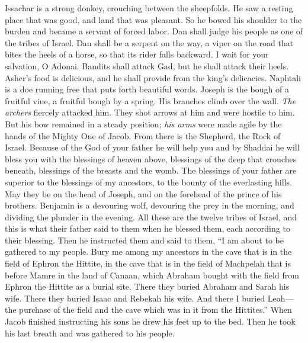 \begin{biblechapter}
\verse Issachar is a strong donkey, 
crouching between the sheepfolds.
\verse He saw a resting place that was good, 
and land that was pleasant. 
So he bowed his shoulder to the burden 
and became a servant of forced labor.
\verse Dan shall judge his people 
as one of the tribes of Israel.
\verse Dan shall be a serpent on the way, 
a viper on the road 
that bites the heels of a horse, 
so that its rider falls backward.
\verse I wait for your salvation, O Adonai.
\verse Bandits shall attack Gad, 
but he shall attack their heels.
\verse Asher’s food is delicious, 
and he shall provide from the king’s delicacies.
\verse Naphtali is a doe running free 
that puts forth beautiful words.
\verse Joseph is the bough of a fruitful vine, 
a fruitful bough by a spring. 
His branches climb over the wall.
\verse \textit{The archers} fiercely attacked him. 
They shot arrows at him and were hostile to him.
\verse But his bow remained in a steady position; 
\textit{his arms} were made agile 
by the hands of the Mighty One of Jacob. 
From there is the Shepherd, the Rock of Israel.
\verse Because of the God of your father he will help you 
and by Shaddai he will bless you 
with the blessings of heaven above, 
blessings of the deep that crouches beneath, 
blessings of the breasts and the womb.
\verse The blessings of your father 
are superior to the blessings of my ancestors, 
to the bounty of the everlasting hills. 
May they be on the head of Joseph, 
and on the forehead of the prince of his brothers.
\verse Benjamin is a devouring wolf, 
devouring the prey in the morning, 
and dividing the plunder in the evening.
 All these are the twelve tribes of Israel, and this is what their father said to them when he blessed them, each according to their blessing.
\verse Then he instructed them and said to them, “I am about to be gathered to my people. Bury me among my ancestors in the cave that is in the field of Ephron the Hittite,
\verse in the cave that is in the field of Machpelah that is before Mamre in the land of Canaan, which Abraham bought with the field from Ephron the Hittite as a burial site.
\verse There they buried Abraham and Sarah his wife. There they buried Isaac and Rebekah his wife. And there I buried Leah—
\verse the purchase of the field and the cave which was in it from the Hittites.”
\verse When Jacob finished instructing his sons he drew his feet up to the bed. Then he took his last breath and was gathered to his people.
\end{biblechapter}

